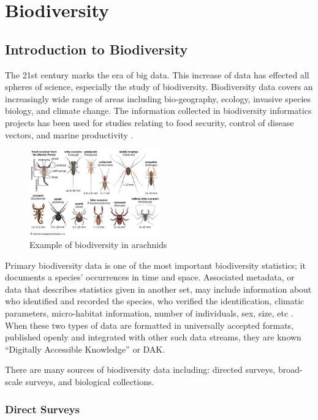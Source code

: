 \chapter{Biodiversity}
\section{Introduction to Biodiversity}

The 21st century marks the era of big data. This increase of data has effected all spheres of science, especially the study of biodiversity.
Biodiversity data covers an increasingly wide range of areas including bio-geography, ecology, invasive species biology, and climate change.
The information collected in biodiversity informatics projects has been used for studies relating to food security, control of disease vectors, and marine productivity \cite{Barve}.  
\begin{figure}[htbp!] 
   \centering
   \includegraphics[width=0.5\textwidth]{pictures/biodiversity/spiders.jpg} 
   \caption{Example of biodiversity in arachnids}
   \label{fig:arachnids}
\end{figure}

Primary biodiversity data is one of the most important biodiversity statistics; it documents a species' occurrences in time and space.
Associated metadata, or data that describes statistics given in another set, may include information about who identified and recorded the species, who verified the identification, climatic parameters, micro-habitat information, number of individuals, sex, size, etc \cite{Barve}.
When these two types of data are formatted in universally accepted formats, published openly and integrated with other such data streams, they are known “Digitally Accessible Knowledge” or DAK.

There are many sources of biodiversity data including: directed surveys, broad-scale surveys, and biological collections. 

\subsection{Direct Surveys}

